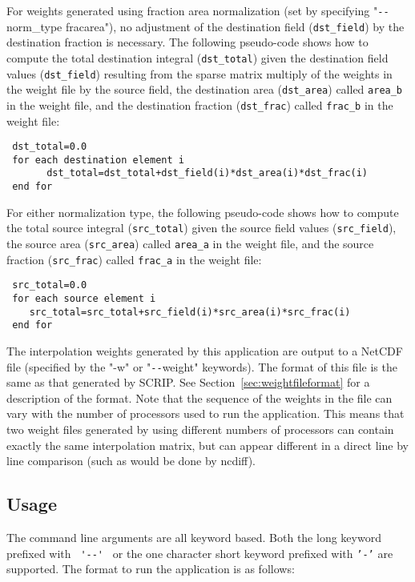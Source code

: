 For weights generated using fraction area normalization (set by specifying "\verb+--+norm\_type fracarea"), no adjustment of the destination field ({\tt dst\_field}) by the destination fraction is necessary. The following pseudo-code shows how to compute the total destination integral ({\tt dst\_total}) given the destination field values ({\tt dst\_field}) resulting
from the sparse matrix multiply of the weights in the weight file by the source field, the destination area ({\tt dst\_area}) called {\tt area\_b} in the
weight file, and the destination fraction ({\tt dst\_frac}) called {\tt frac\_b} in the weight file: 

\begin{verbatim}
 dst_total=0.0
 for each destination element i
       dst_total=dst_total+dst_field(i)*dst_area(i)*dst_frac(i)
 end for
\end{verbatim}

For either normalization type, the following pseudo-code shows how to compute the total source integral ({\tt src\_total}) given the source field values ({\tt src\_field}), the source area ({\tt src\_area}) called {\tt area\_a} in the weight file, and the source fraction ({\tt src\_frac}) called {\tt frac\_a} in the weight file:

\begin{verbatim}
 src_total=0.0
 for each source element i
    src_total=src_total+src_field(i)*src_area(i)*src_frac(i)
 end for
\end{verbatim}



The interpolation weights generated by this application are output to a NetCDF file (specified by the "-w" or "\verb+--+weight"
keywords). The format of this file is the same as that generated by SCRIP. See Section~\ref{sec:weightfileformat} for a description of the format.
Note that the sequence of the weights in the file can
vary with the number of processors used to run the application. This means that two weight files generated by using different
numbers of processors can contain exactly the same interpolation matrix, but can appear different in a direct line by line
comparison (such as would be done by ncdiff).

\subsection{Usage}\label{sec:regridusage}

The command line arguments are all keyword based.  Both the long keyword prefixed with \verb+ '--' + or the
one character short keyword prefixed with {\tt '-'} are supported.  The format to run the application is
as follows:

